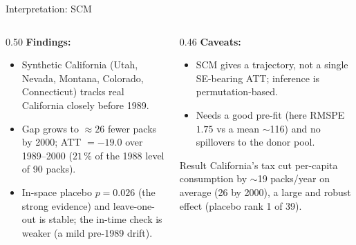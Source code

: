 \documentclass[main.tex]{subfiles}
\begin{document}
\begin{frame}{Interpretation: SCM}

  \begin{columns}[T]
    \begin{column}{0.50\textwidth}
      \textbf{Findings:}
      \begin{itemize}\small
        \item Synthetic California (Utah, Nevada, Montana, Colorado,
          Connecticut) tracks real California closely before 1989.
        \item Gap grows to $\approx 26$ fewer packs by 2000; ATT
          $= -19.0$ over 1989--2000 ($21\,\%$ of the 1988 level of 90
          packs).
        \item In-space placebo $p = 0.026$ (the strong evidence) and
          leave-one-out is stable; the in-time check is weaker (a mild
          pre-1989 drift).
      \end{itemize}
    \end{column}
    \begin{column}{0.46\textwidth}
      \textbf{Caveats:}
      \begin{itemize}\small
        \item SCM gives a trajectory, not a single SE-bearing ATT;
          inference is permutation-based.
        \item Needs a good pre-fit (here RMSPE $1.75$ vs a mean $\sim$116)
          and no spillovers to the donor pool.
      \end{itemize}
      \begin{exampleblock}{\footnotesize Result}
        \footnotesize California's tax cut per-capita consumption by
        $\sim$19 packs/year on average (26 by 2000), a large and robust
        effect (placebo rank 1 of 39).
      \end{exampleblock}
    \end{column}
  \end{columns}

\end{frame}
\end{document}
